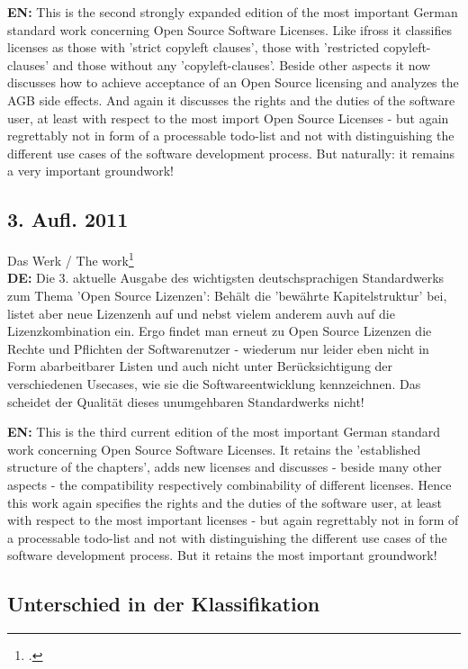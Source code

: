 \documentclass[DIV=calc,BCOR=5mm,11pt,headings=small,oneside,abstract=true, toc=bib]{scrartcl}
\begin{document}
\textbf{EN:} This is the second strongly expanded edition of the most important
German standard work concerning Open Source Software Licenses. Like ifross it
classifies licenses as those with 'strict copyleft clauses', those with
'restricted copyleft-clauses' and those without any 'copyleft-clauses'. Beside
other aspects it now discusses how to achieve acceptance of an Open Source
licensing and analyzes the AGB side effects. And again it discusses the rights
and the duties of the software user, at least with respect to the most import
Open Source Licenses - but again regrettably not in form of a processable
todo-list and not with distinguishing the different use cases of the software
development process. But naturally: it remains a very important groundwork!

\subsection{3. Aufl. 2011}
Das Werk / The work\footcite[][]{JaeMet2011a} \\

\textbf{DE:} Die 3. aktuelle Ausgabe des wichtigsten deutschsprachigen
Standardwerks zum Thema 'Open Source Lizenzen': Behält die 'bewährte
Kapitelstruktur' bei, listet aber neue Lizenzenh auf und nebst vielem anderem
auvh auf die Lizenzkombination ein. Ergo findet man erneut zu Open Source
Lizenzen die Rechte und Pflichten der Softwarenutzer - wiederum nur leider eben
nicht in Form abarbeitbarer Listen und auch nicht unter Berücksichtigung der
verschiedenen Usecases, wie sie die Softwareentwicklung kennzeichnen. Das
scheidet der Qualität dieses unumgehbaren Standardwerks nicht!

\textbf{EN:} This is the third current edition of the most important German
standard work concerning Open Source Software Licenses. It retains the
'established structure of the chapters', adds new licenses and discusses -
beside many other aspects - the compatibility respectively combinability of
different licenses. Hence this work again specifies the rights and the duties of
the software user, at least with respect to the most important licenses - but
again regrettably not in form of a processable todo-list and not with
distinguishing the different use cases of the software development process. But
it retains the most important groundwork!

\subsection{Unterschied in der Klassifikation}
\end{document}
